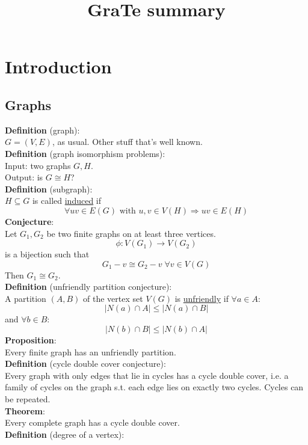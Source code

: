 \documentclass[a4paper, 12pt]{article}
\begin{document}
	\begin{titlepage} 
		\title{GraTe summary}
		\clearpage\maketitle
		\thispagestyle{empty}
	\end{titlepage}
	\tableofcontents
	\section{Introduction}
	\subsection{Graphs}
	\textbf{Definition} (graph):\\
	$G = (V,E)$, as usual. Other stuff that's well known.\\
	\textbf{Definition} (graph isomorphism problems):\\
	Input: two graphs $G,H$.\\
	Output: is $G \cong H$?\\
	\textbf{Definition} (subgraph):\\
	$H \subseteq G$ is called \underline{induced} if \[\forall uv \in E(G) \text{ with } u,v \in V(H) \Rightarrow uv \in E(H)\]
	\textbf{Conjecture}:\\
	Let $G_1, G_2$ be two finite graphs on at least three vertices. \[\phi: V(G_1) \to V(G_2)\] is a bijection such that \[G_1-v \cong G_2-v \; \forall v\in V(G)\]
	Then $G_1 \cong G_2$.\\
	\textbf{Definition} (unfriendly partition conjecture):\\
	A partition $(A,B)$ of the vertex set $V(G)$ is \underline{unfriendly} if $\forall a \in A:$\[\left|N(a) \cap A \right| \leq \left|N(a) \cap B\right|\] and $\forall b \in B$: \[\left|N(b) \cap B\right| \leq \left|N(b) \cap A\right|\]
	\textbf{Proposition}:\\
	Every finite graph has an unfriendly partition.\\
	\textbf{Definition} (cycle double cover conjecture):\\
	Every graph with only edges that lie in cycles has a cycle double cover, i.e. a family of cycles on the graph s.t. each edge lies on exactly two cycles. Cycles can be repeated.\\
	\textbf{Theorem}:\\
	Every complete graph has a cycle double cover.\\
	\textbf{Definition} (degree of a vertex):\\
\end{document}
